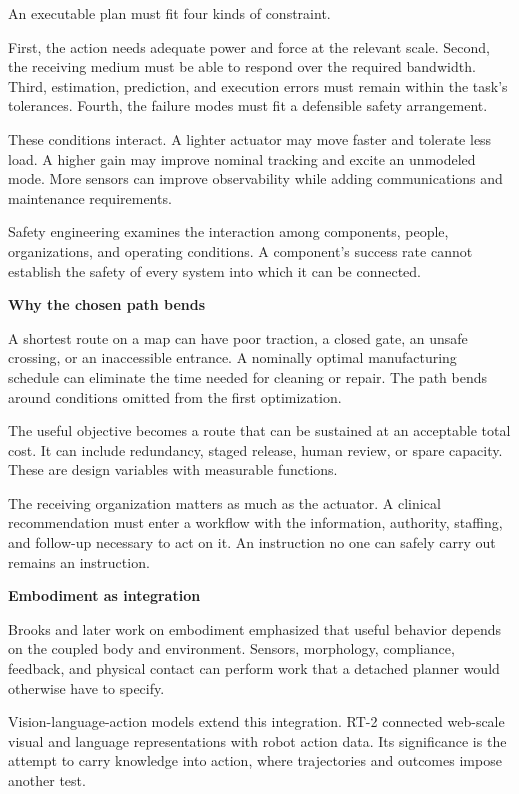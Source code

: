 \documentclass[11pt,openany]{book}
\newcommand{\subhead}[1]{\par\medskip\noindent\textbf{#1}\par\nobreak\smallskip}
\begin{document}
An executable plan must fit four kinds of constraint.

First, the action needs adequate power and force at the relevant scale. Second, the receiving medium must be able to respond over the required bandwidth. Third, estimation, prediction, and execution errors must remain within the task's tolerances. Fourth, the failure modes must fit a defensible safety arrangement.

These conditions interact. A lighter actuator may move faster and tolerate less load. A higher gain may improve nominal tracking and excite an unmodeled mode. More sensors can improve observability while adding communications and maintenance requirements.

Safety engineering examines the interaction among components, people, organizations, and operating conditions.\cite{perrow1984,leveson2011} A component's success rate cannot establish the safety of every system into which it can be connected.

\subhead{Why the chosen path bends}

A shortest route on a map can have poor traction, a closed gate, an unsafe crossing, or an inaccessible entrance. A nominally optimal manufacturing schedule can eliminate the time needed for cleaning or repair. The path bends around conditions omitted from the first optimization.

The useful objective becomes a route that can be sustained at an acceptable total cost. It can include redundancy, staged release, human review, or spare capacity. These are design variables with measurable functions.

The receiving organization matters as much as the actuator. A clinical recommendation must enter a workflow with the information, authority, staffing, and follow-up necessary to act on it. An instruction no one can safely carry out remains an instruction.

\subhead{Embodiment as integration}

Brooks and later work on embodiment emphasized that useful behavior depends on the coupled body and environment.\cite{brooks1991,pfeifer2006} Sensors, morphology, compliance, feedback, and physical contact can perform work that a detached planner would otherwise have to specify.

Vision-language-action models extend this integration. RT-2 connected web-scale visual and language representations with robot action data.\cite{zitkovich2023} Its significance is the attempt to carry knowledge into action, where trajectories and outcomes impose another test.
\end{document}
